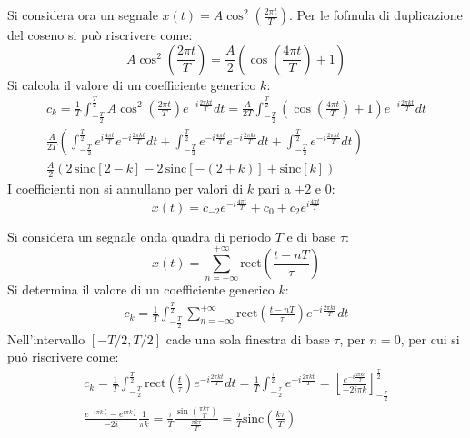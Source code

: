\documentclass{article}
\numberwithin{equation}{subsection}
\begin{document}
Si considera ora un segnale $x(t)=A\cos^2\left(\frac{2\pi t}{T}\right)$. Per le fofmula di duplicazione del coseno si può riscrivere come:
\begin{equation*}
    A\cos^2\left(\frac{2\pi t}{T}\right)=\frac{A}{2}\left(\cos\left(\frac{4\pi t}{T}\right)+1\right)
\end{equation*}
Si calcola il valore di un coefficiente generico $k$:
\begin{gather*}
    c_k=\displaystyle\frac{1}{T}\int_{-\frac{T}{2}}^{\frac{T}{2}}A\cos^2\left(\frac{2\pi t}{T}\right)e^{-i\frac{2\pi kt}{T}}dt=
    \frac{A}{2T}\int_{-\frac{T}{2}}^{\frac{T}{2}}\left(\cos\left(\frac{4\pi t}{T}\right)+1\right)e^{-i\frac{2\pi kt}{T}}dt\\
    \displaystyle\frac{A}{2T}\left(\int_{-\frac{T}{2}}^{\frac{T}{2}}e^{i\frac{4\pi t}{T}}e^{-i\frac{2\pi kt}{T}}dt+\int_{-\frac{T}{2}}^{\frac{T}{2}}e^{-i\frac{4\pi t}{T}}e^{-i\frac{2\pi kt}{T}}dt+\int_{-\frac{T}{2}}^{\frac{T}{2}}e^{-i\frac{2\pi kt}{T}}dt\right)\\
    \displaystyle\frac{A}{2}\left(2\,\mbox{sinc}[2-k]-2\,\mbox{sinc}[-(2+k)]+\mbox{sinc}[k]\right)
\end{gather*}
I coefficienti non si annullano per valori di $k$ pari a $\pm2$ e $0$:
\begin{equation*}
    x(t)=c_{-2}e^{-i\frac{4\pi t}{T}}+c_0+c_2e^{i\frac{4\pi t}{T}}
\end{equation*}


Si considera un segnale onda quadra di periodo $T$ e di base $\tau$: 
\begin{equation*}
    x(t)=\displaystyle\sum_{n=-\infty}^{+\infty}\mbox{rect}\left(\frac{t-nT}{\tau}\right)
\end{equation*}
Si determina il valore di un coefficiente generico $k$:
\begin{gather*}
    c_k=\displaystyle\frac{1}{T}\int_{-\frac{T}{2}}^{\frac{T}{2}}\sum_{n=-\infty}^{+\infty}\mbox{rect}\left(\frac{t-nT}{\tau}\right)e^{-i\frac{2\pi k t}{T}}dt
\end{gather*}
Nell'intervallo $[-T/2,T/2]$ cade una sola finestra di base $\tau$, per $n=0$, per cui si può riscrivere come:
\begin{gather*}
    c_k=\displaystyle\frac{1}{T}\int_{-\frac{T}{2}}^{\frac{T}{2}}\mbox{rect}\left(\frac{t}{\tau}\right)e^{-i\frac{2\pi k t}{T}}dt=\frac{1}{T}\int_{-\frac{\tau}{2}}^{\frac{\tau}{2}}e^{-i\frac{2\pi k t}{T}}=
    \left[\frac{e^{-i\frac{2\pi kt}{T}}}{-2i\pi k}\right]_{-\frac{\tau}{2}}^{\frac{\tau}{2}}\\
    \displaystyle\frac{e^{-i\pi k\frac{\tau}{T}}-e^{i\pi k\frac{\tau}{T}}}{-2i}\frac{1}{\pi k}=\frac{\tau}{T}\frac{\sin\left(\frac{\pi k \tau}{T}\right)}{\frac{\pi k \tau}{T}}=\frac{\tau}{T}\mbox{sinc}\left(\frac{k \tau}{T}\right)
\end{gather*}
\end{document}
